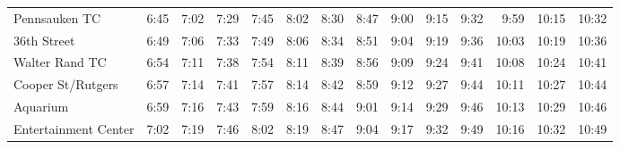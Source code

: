 \begin{center}
\begin{tabular}{@{}lrrrrrrrrrrrrr@{}}
Pennsauken TC & 6:45 & 7:02 & 7:29 & 7:45 & 8:02 & 8:30 & 8:47 & 9:00 & 9:15 & 9:32 & 9:59 & 10:15 & 10:32 \\
36th Street & 6:49 & 7:06 & 7:33 & 7:49 & 8:06 & 8:34 & 8:51 & 9:04 & 9:19 & 9:36 & 10:03 & 10:19 & 10:36 \\
Walter Rand TC & 6:54 & 7:11 & 7:38 & 7:54 & 8:11 & 8:39 & 8:56 & 9:09 & 9:24 & 9:41 & 10:08 & 10:24 & 10:41 \\
Cooper St/Rutgers & 6:57 & 7:14 & 7:41 & 7:57 & 8:14 & 8:42 & 8:59 & 9:12 & 9:27 & 9:44 & 10:11 & 10:27 & 10:44 \\
Aquarium & 6:59 & 7:16 & 7:43 & 7:59 & 8:16 & 8:44 & 9:01 & 9:14 & 9:29 & 9:46 & 10:13 & 10:29 & 10:46 \\
Entertainment Center & 7:02 & 7:19 & 7:46 & 8:02 & 8:19 & 8:47 & 9:04 & 9:17 & 9:32 & 9:49 & 10:16 & 10:32 & 10:49 \\
\bottomrule\end{tabular}\end{center}
